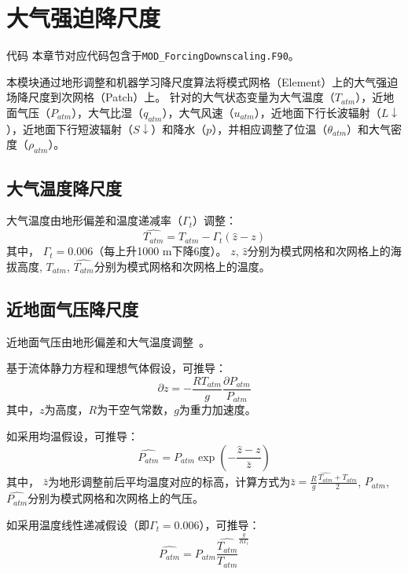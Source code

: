 \chapter{大气强迫降尺度}\label{大气强迫降尺度}
\begin{mymdframed}{代码}
本章节对应代码包含于\texttt{MOD\_ForcingDownscaling.F90}。
\end{mymdframed}

本模块通过地形调整和机器学习降尺度算法将模式网格（Element）上的大气强迫场降尺度到次网格（Patch）上。
针对的大气状态变量为大气温度（$T_{atm}$），近地面气压（$P_{atm}$），大气比湿（$q_{atm}$），大气风速（$u_{atm}$），近地面下行长波辐射（$L↓$），近地面下行短波辐射（$S↓$）和降水（$p$），并相应调整了位温（$\theta_{atm}$）和大气密度（$\rho_{atm}$）。

\section{大气温度降尺度}
大气温度由地形偏差和温度递减率（${\Gamma}_{t}$）调整：
\begin{equation}\label{T_atm}
\hat{T_{atm}}=T_{atm}-{\Gamma}_{t} \left(\hat{z}-z\right)
\end{equation}
其中，
${\Gamma}_{t}=0.006$（每上升1000 m下降6度）。
$z$, $\hat{z}$分别为模式网格和次网格上的海拔高度,
$T_{atm}$, $\hat{T_{atm}}$分别为模式网格和次网格上的温度。

\section{近地面气压降尺度}
近地面气压由地形偏差和大气温度调整~\citep{Cosgrove2003}。

基于流体静力方程和理想气体假设，可推导：
\begin{equation}
\partial z=-\frac{RT_{atm}}{g}\frac{\partial P_{atm}}{P_{atm}}
\end{equation}
其中，$z$为高度，$R$为干空气常数，$g$为重力加速度。

如采用均温假设，可推导：
\begin{equation}
\hat{P_{atm}}=P_{atm} \exp{\left(-\frac{\hat{z}-z}{\bar{z}}\right)}
\end{equation}
其中，
$\bar{z}$为地形调整前后平均温度对应的标高，计算方式为$\bar{z}=\frac{R}{g} \frac{\hat{T_{atm}}+T_{atm}}{2}$,  
$P_{atm}$, $\hat{P_{atm}}$分别为模式网格和次网格上的气压。

如采用温度线性递减假设（即${\Gamma}_{t}=0.006$），可推导：
\begin{equation}
\hat{P_{atm}}=P_{atm} \frac{\hat{T_{atm}}}{T_{atm}}^\frac{g}{R\Gamma_{t}}
\end{equation}

